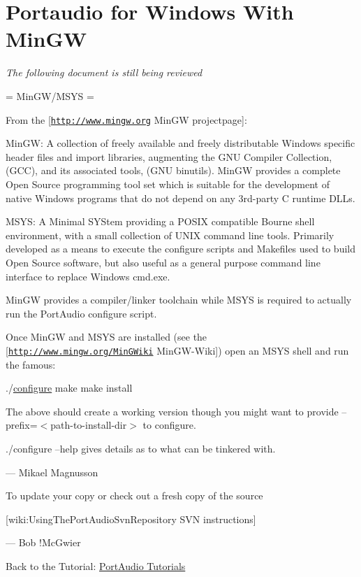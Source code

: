 \hypertarget{compile_windows_mingw_comp_mingw1}{}\section{Portaudio for Windows With Min\+GW}\label{compile_windows_mingw_comp_mingw1}
{\itshape The following document is still being reviewed}

= Min\+G\+W/\+M\+S\+YS =

From the \mbox{[}\href{http://www.mingw.org}{\tt http\+://www.\+mingw.\+org} Min\+GW projectpage\mbox{]}\+:

Min\+GW\+: A collection of freely available and freely distributable Windows specific header files and import libraries, augmenting the G\+NU Compiler Collection, (G\+CC), and its associated tools, (G\+NU binutils). Min\+GW provides a complete Open Source programming tool set which is suitable for the development of native Windows programs that do not depend on any 3rd-\/party C runtime D\+L\+Ls.

M\+S\+YS\+: A Minimal S\+Y\+Stem providing a P\+O\+S\+IX compatible Bourne shell environment, with a small collection of U\+N\+IX command line tools. Primarily developed as a means to execute the configure scripts and Makefiles used to build Open Source software, but also useful as a general purpose command line interface to replace Windows cmd.\+exe.

Min\+GW provides a compiler/linker toolchain while M\+S\+YS is required to actually run the Port\+Audio configure script.

Once Min\+GW and M\+S\+YS are installed (see the \mbox{[}\href{http://www.mingw.org/MinGWiki}{\tt http\+://www.\+mingw.\+org/\+Min\+G\+Wiki} Min\+G\+W-\/\+Wiki\mbox{]}) open an M\+S\+YS shell and run the famous\+:


\begin{DoxyCode}
./\hyperlink{namespacewaflib_1_1extras_1_1autowaf_aed9c0237757b6bbcc7a442d726e82c47}{configure}
make
make install
\end{DoxyCode}


The above should create a working version though you might want to provide \textquotesingle{}--prefix=$<$path-\/to-\/install-\/dir$>$\textquotesingle{} to configure.

\textquotesingle{}./configure --help\textquotesingle{} gives details as to what can be tinkered with.

--- Mikael Magnusson

To update your copy or check out a fresh copy of the source

\mbox{[}wiki\+:Using\+The\+Port\+Audio\+Svn\+Repository S\+VN instructions\mbox{]}

--- Bob !\+Mc\+Gwier

Back to the Tutorial\+: \hyperlink{tutorial_start}{Port\+Audio Tutorials} 